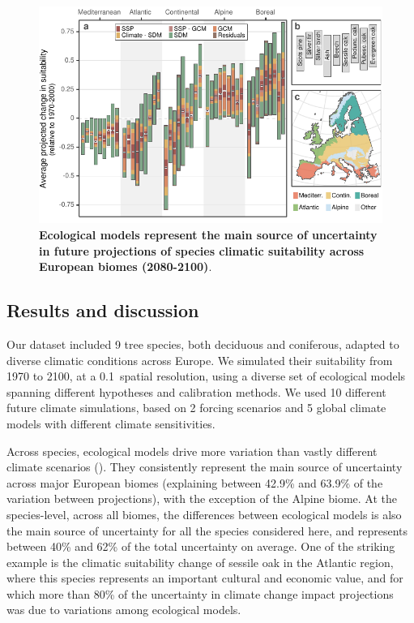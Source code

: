 \documentclass[11pt,letter]{article}
\begin{document}
\begin{figure}
	\centering
	\includegraphics[width=0.85\linewidth]{../newfigures/files/figure1}
	\caption{\textbf{Ecological models represent the main source of uncertainty in future projections of species climatic suitability across European biomes (2080-2100)}.}
	\label{fig:anovaspecies}
\end{figure}

\subsection*{Results and discussion}

Our dataset included 9 tree species, both deciduous and coniferous, adapted to diverse climatic conditions across Europe. We simulated their suitability from 1970 to 2100, at a 0.1\degree~spatial resolution, using a diverse set of ecological models spanning different hypotheses and calibration methods. We used 10 different future climate simulations, based on 2 forcing scenarios and 5 global climate models with different climate sensitivities.

Across species, ecological models drive more variation than vastly different climate scenarios (). They consistently represent the main source of uncertainty across major European biomes (explaining between 42.9\% and 63.9\% of the variation between projections), with the exception of the Alpine biome. At the species-level, across all biomes, the differences between ecological models is also the main source of uncertainty for all the species considered here, and represents between 40\% and 62\% of the total uncertainty on average. One of the striking example is the climatic suitability change of sessile oak in the Atlantic region, where this species represents an important cultural and economic value, and for which more than 80\% of the uncertainty in climate change impact projections was due to variations among ecological models. 
\end{document}
